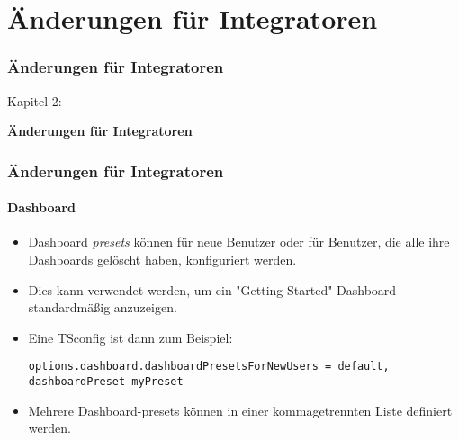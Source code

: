 %

\section{Änderungen für Integratoren}
\begin{frame}[fragile]
	\frametitle{Änderungen für Integratoren}

	\begin{center}\huge{Kapitel 2:}\end{center}
	\begin{center}\huge{\color{typo3darkgrey}\textbf{Änderungen für Integratoren}}\end{center}

\end{frame}


\begin{frame}[fragile]
	\frametitle{Änderungen für Integratoren}
	\framesubtitle{Dashboard}

	\lstset{basicstyle=\tiny\ttfamily}

	\begin{itemize}
		\item Dashboard \textit{presets} können für neue Benutzer oder für Benutzer, die alle ihre Dashboards gelöscht haben, konfiguriert werden.
		\item Dies kann verwendet werden, um ein "Getting Started"-Dashboard standardmäßig anzuzeigen.
		\item Eine TSconfig ist dann zum Beispiel:

\vspace{-0.4cm}
\begin{lstlisting}
options.dashboard.dashboardPresetsForNewUsers = default, dashboardPreset-myPreset
\end{lstlisting}

		\item Mehrere Dashboard-presets können in einer kommagetrennten Liste definiert werden.

	\end{itemize}

\end{frame}

